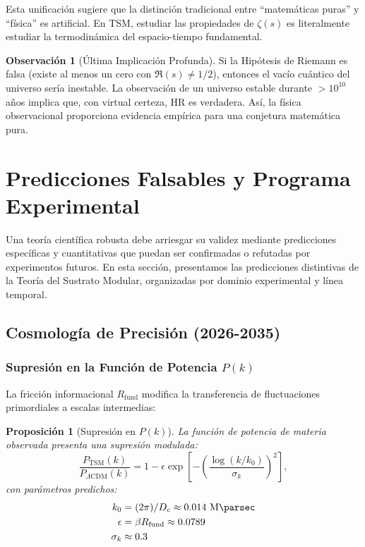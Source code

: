 \documentclass[11pt, a4paper]{article}
\theoremstyle{plain}
\newtheorem{proposicion}[teorema]{Proposición}
\theoremstyle{definition}
\newtheorem{observacion}[teorema]{Observación}
\newcommand{\Rfactor}{R_{\text{fund}}}
\begin{document}
Esta unificación sugiere que la distinción tradicional entre ``matemáticas puras'' y ``física'' es artificial. En TSM, estudiar las propiedades de $\zeta(s)$ es literalmente estudiar la termodinámica del espacio-tiempo fundamental.

\begin{observacion}[Última Implicación Profunda]
Si la Hipótesis de Riemann es falsa (existe al menos un cero con $\Re(s) \neq 1/2$), entonces el vacío cuántico del universo sería inestable. La observación de un universo estable durante $>10^{10}$ años implica que, con virtual certeza, HR es verdadera. Así, la física observacional proporciona evidencia empírica para una conjetura matemática pura.
\end{observacion}


\section{Predicciones Falsables y Programa Experimental}
\label{sec:predicciones}

Una teoría científica robusta debe arriesgar su validez mediante predicciones específicas y cuantitativas que puedan ser confirmadas o refutadas por experimentos futuros. En esta sección, presentamos las predicciones distintivas de la Teoría del Sustrato Modular, organizadas por dominio experimental y línea temporal.

\subsection{Cosmología de Precisión (2026-2035)}

\subsubsection{Supresión en la Función de Potencia \texorpdfstring{$P(k)$}{P(k)}}

La fricción informacional $\Rfactor$ modifica la transferencia de fluctuaciones primordiales a escalas intermedias:

\begin{proposicion}[Supresión en $P(k)$]
La función de potencia de materia observada presenta una supresión modulada:
\begin{equation}
\frac{P_{\text{TSM}}(k)}{P_{\Lambda\text{CDM}}(k)} = 1 - \epsilon \exp\left[-\left(\frac{\log(k/k_0)}{\sigma_k}\right)^2\right],
\end{equation}
con parámetros predichos:
\begin{align*}
k_0 &= (2\pi)/D_c \approx 0.014\ \si{\per\mega\parsec} \\
\epsilon &= \beta\Rfactor \approx 0.0789 \\
\sigma_k &\approx 0.3
\end{align*}
\end{proposicion}
\end{document}
